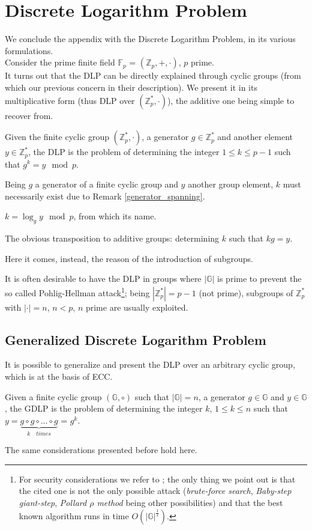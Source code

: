 \section{Discrete Logarithm Problem}
\label{DLP}
We conclude the appendix with the Discrete Logarithm Problem, in its various formulations.\\
Consider the prime finite field $\mathbb{F}_p$ = $(\mathbb{Z}_p,+,\cdot)$, $p$ prime.\\
It turns out that the DLP can be directly explained through cyclic groups (from which our previous concern in their description). We present it in its multiplicative form (thus DLP over $(\mathbb{Z}_p^{*},\cdot)$), the additive one being simple to recover from.
\begin{mydef}
    Given the finite cyclic group $(\mathbb{Z}_p^{*},\cdot)$, a generator $g \in \mathbb{Z}_p^{*}$ and another element $y \in \mathbb{Z}_p^{*}$, the DLP is the problem of determining the integer $1 \leq k \leq p-1$ such that $g^k = y \mod{p}$. 
\end{mydef}
\begin{myrem}
    Being $g$ a generator of a finite cyclic group and $y$ another group element, $k$ must necessarily exist due to Remark \ref{generator_spanning}.
\end{myrem}
\begin{myrem}
    $k = \log_g{y} \mod{p}$, from which its name.
\end{myrem}
\begin{myrem}
    The obvious transposition to additive groups: determining $k$ such that $kg=y$.
\end{myrem}
\noindent
Here it comes, instead, the reason of the introduction of subgroups.
\begin{myrem}
    It is often desirable to have the DLP in groups where $|\mathbb{G}|$ is prime to prevent the so called Pohlig-Hellman attack\footnote{For security considerations we refer to \cite{UnderstandingCrypto}; the only thing we point out is that the cited one is not the only possible attack (\textit{brute-force search}, \textit{Baby-step giant-step}, \textit{Pollard $\rho$ method} being other possibilities) and that the best known algorithm runs in time $O(|\mathbb{G}|^{\frac{1}{2}})$.}; being $|\mathbb{Z}_p^{*}|=p-1$ (not prime), subgroups of  $\mathbb{Z}_p^{*}$ with $|\cdot|=n$, $n < p$, $n$ prime are usually exploited.
\end{myrem}
\subsection{Generalized Discrete Logarithm Problem}
It is possible to generalize and present the DLP over an arbitrary cyclic group, which is at the basis of ECC.
\begin{mydef}
    Given a finite cyclic group $(\mathbb{G},\circ)$ such that $|\mathbb{G}| = n$, a generator $g \in \mathbb{G}$ and $y \in \mathbb{G}$, the GDLP is the problem of determining the integer $k$, $1 \leq k \leq n$ such that $y = \underbrace{g \circ g \circ \dots \circ g}_{k \quad times}$ = $g^k$.
\end{mydef}
\begin{myrem}
    The same considerations presented before hold here.
\end{myrem}